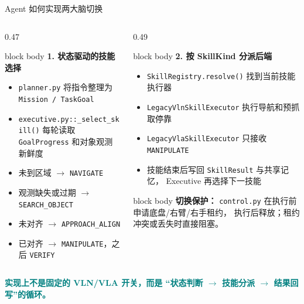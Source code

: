 \documentclass[aspectratio=169,11pt]{beamer}
\begin{document}
\begin{frame}{Agent 如何实现两大脑切换}
  \begin{columns}[T,onlytextwidth]
    \begin{column}{0.47\textwidth}
      \begin{beamercolorbox}[rounded=true,sep=0.75em]{block body}
        \textbf{\color{navy}1. 状态驱动的技能选择}
        \begin{itemize}
          \setlength{\itemsep}{0.42em}
          \item \texttt{planner.py} 将指令整理为 \texttt{Mission / TaskGoal}
          \item \texttt{executive.py::\_select\_skill()} 每轮读取
            \texttt{GoalProgress} 和对象观测新鲜度
          \item 未到区域 $\rightarrow$ \texttt{NAVIGATE}
          \item 观测缺失或过期 $\rightarrow$ \texttt{SEARCH\_OBJECT}
          \item 未对齐 $\rightarrow$ \texttt{APPROACH\_ALIGN}
          \item 已对齐 $\rightarrow$ \texttt{MANIPULATE}，之后
            \texttt{VERIFY}
        \end{itemize}
      \end{beamercolorbox}
    \end{column}
    \begin{column}{0.49\textwidth}
      \begin{beamercolorbox}[rounded=true,sep=0.75em]{block body}
        \textbf{\color{navy}2. 按 SkillKind 分派后端}
        \begin{itemize}
          \setlength{\itemsep}{0.42em}
          \item \texttt{SkillRegistry.resolve()} 找到当前技能执行器
          \item \texttt{LegacyVlnSkillExecutor} 执行导航和预抓取停靠
          \item \texttt{LegacyVlaSkillExecutor} 只接收
            \texttt{MANIPULATE}
          \item 技能结束后写回 \texttt{SkillResult} 与共享记忆，
            Executive 再选择下一技能
        \end{itemize}
      \end{beamercolorbox}

      \vspace{0.55em}
      \begin{beamercolorbox}[rounded=true,sep=0.65em]{block body}
        \small
        \textbf{\color{orange}切换保护：}
        \texttt{control.py} 在执行前申请底盘/右臂/右手租约，
        执行后释放；租约冲突或丢失时直接阻塞。
      \end{beamercolorbox}
    \end{column}
  \end{columns}

  \vspace{0.55em}
  \centering
  \textcolor{teal}{\textbf{实现上不是固定的 VLN/VLA 开关，而是
  “状态判断 $\rightarrow$ 技能分派 $\rightarrow$ 结果回写”的循环。}}
\end{frame}
\end{document}
